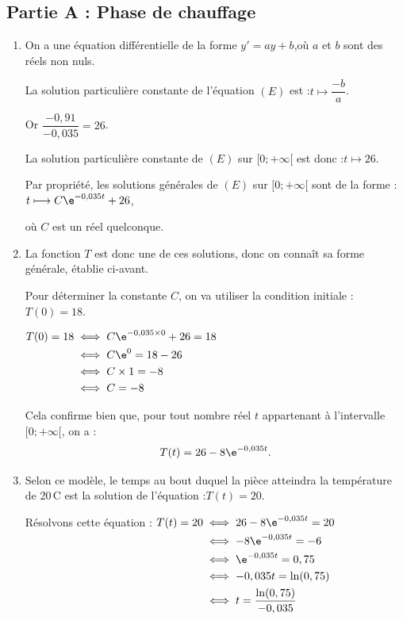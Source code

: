 \subsection*{Partie A : Phase de chauffage}
		\begin{enumerate}
			\item On a une équation différentielle de la forme \quad $y' = a y + b$,\quad où $a$ et $b$ sont des réels non nuls.

			La solution particulière constante de l'équation $(E)$ est :\quad $t \longmapsto \dfrac{-b}{a}$.

			Or \quad $\dfrac{-0,91}{-0,035} = 26$.

			La solution particulière constante de $(E)$ sur $[0 ; +\infty[$ est donc :\quad $t \longmapsto 26$.

			Par propriété, les solutions générales de $(E)$ sur $[0 ; +\infty[$ sont de la forme :\quad $t \longmapsto C\e^{-0,035t} + 26$,

			où $C$ est un réel quelconque.

			\item La fonction $T$ est donc une de ces solutions, donc on connaît sa forme générale, établie ci-avant.

			Pour déterminer la constante $C$, on va utiliser la condition initiale :\quad $T(0) = 18$.

			$\begin{aligned}
				T(0) = 18
					&\iff C\e^{-0,035\times 0} + 26 = 18\\
					&\iff C\e^{0} = 18 - 26\\
					&\iff C\times 1 = -8\\
					&\iff C = -8\\
			\end{aligned}$

			Cela confirme bien que, pour tout nombre réel $t$ appartenant à l'intervalle $[0 ;+\infty[$, on a :
			\[ T(t)=26-8 \e^{-0,035 t}.\]

			\item Selon ce modèle, le temps au bout duquel la pièce atteindra la température de 20\,\textdegree{}C est la solution de l'équation :\quad $T(t) = 20$.

			Résolvons cette équation : \quad$\begin{aligned}[t]
				T(t) = 20
					&\iff 26 - 8\e^{-0,035t} = 20\\
					&\iff -8\e^{-0,035t} = - 6\\
					&\iff \e^{-0,035t} = 0,75\\
					&\iff -0,035t = \ln(0,75)\\
					&\iff t = \dfrac{\ln(0,75)}{-0,035}
				\end{aligned}$


\end{enumerate}
